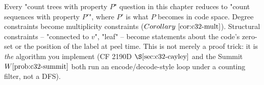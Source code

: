 \begin{insightbox}
Every "count trees with property \(P\)" question in this chapter reduces to
"count sequences with property \(P'\)", where \(P'\) is what \(P\) becomes in
code space.  Degree constraints become multiplicity constraints
(\(\corref{c32-mult}\)).  Structural constraints -- "connected to \(v\)",
"leaf" -- become statements about the code's zero-set or the position of the
label at peel time.  This is not merely a proof trick: it is \emph{the}
algorithm you implement (CF 2190D \(\secref{c32-cayley}\) and the Summit
\(\probref{c32-summit}\) both run an encode/decode-style loop under a
counting filter, not a DFS).
\end{insightbox}
